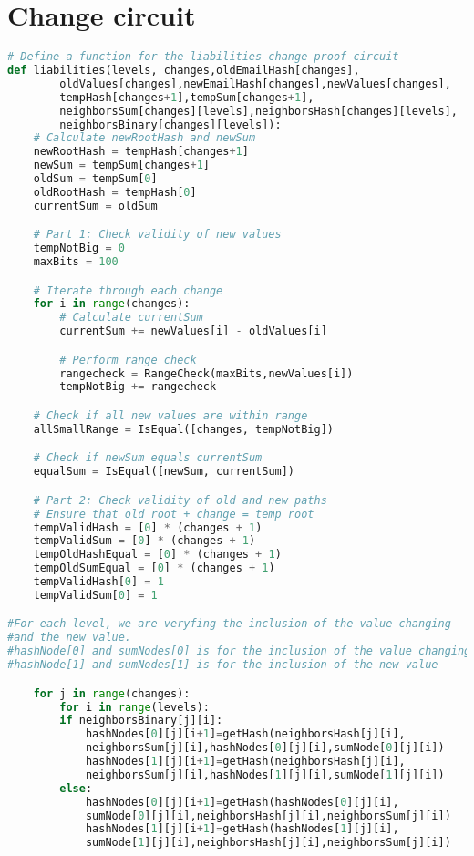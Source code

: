 \section{Change circuit}
\label{subsec:plcc}
\begin{lstlisting}[language=Python, caption=Liabilities change circuit pseudocode]
# Define a function for the liabilities change proof circuit
def liabilities(levels, changes,oldEmailHash[changes],
        oldValues[changes],newEmailHash[changes],newValues[changes],
        tempHash[changes+1],tempSum[changes+1],
        neighborsSum[changes][levels],neighborsHash[changes][levels],
        neighborsBinary[changes][levels]):         
    # Calculate newRootHash and newSum
    newRootHash = tempHash[changes+1]
    newSum = tempSum[changes+1]
    oldSum = tempSum[0]
    oldRootHash = tempHash[0]
    currentSum = oldSum

    # Part 1: Check validity of new values
    tempNotBig = 0
    maxBits = 100

    # Iterate through each change
    for i in range(changes):
        # Calculate currentSum
        currentSum += newValues[i] - oldValues[i]

        # Perform range check
        rangecheck = RangeCheck(maxBits,newValues[i])
        tempNotBig += rangecheck

    # Check if all new values are within range
    allSmallRange = IsEqual([changes, tempNotBig])

    # Check if newSum equals currentSum
    equalSum = IsEqual([newSum, currentSum])

    # Part 2: Check validity of old and new paths
    # Ensure that old root + change = temp root
    tempValidHash = [0] * (changes + 1)
    tempValidSum = [0] * (changes + 1)
    tempOldHashEqual = [0] * (changes + 1)
    tempOldSumEqual = [0] * (changes + 1)
    tempValidHash[0] = 1
    tempValidSum[0] = 1

#For each level, we are veryfing the inclusion of the value changing
#and the new value.
#hashNode[0] and sumNodes[0] is for the inclusion of the value changing
#hashNode[1] and sumNodes[1] is for the inclusion of the new value

    for j in range(changes):
        for i in range(levels):
        if neighborsBinary[j][i]:
            hashNodes[0][j][i+1]=getHash(neighborsHash[j][i],
            neighborsSum[j][i],hashNodes[0][j][i],sumNode[0][j][i])
            hashNodes[1][j][i+1]=getHash(neighborsHash[j][i],
            neighborsSum[j][i],hashNodes[1][j][i],sumNode[1][j][i])
        else:
            hashNodes[0][j][i+1]=getHash(hashNodes[0][j][i],
            sumNode[0][j][i],neighborsHash[j][i],neighborsSum[j][i])
            hashNodes[1][j][i+1]=getHash(hashNodes[1][j][i],
            sumNode[1][j][i],neighborsHash[j][i],neighborsSum[j][i])


\end{lstlisting}
